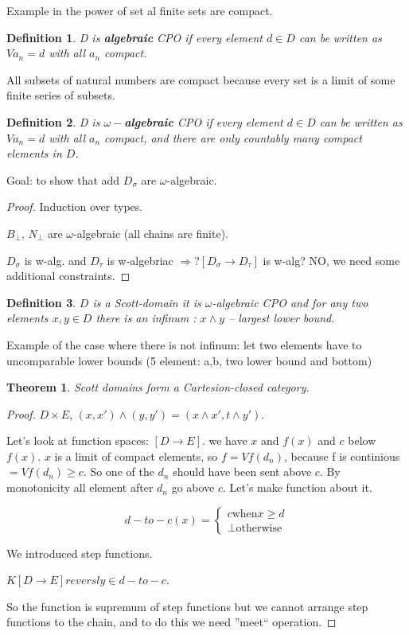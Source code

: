 \documentclass[a4paper,10pt]{book}
\newtheorem{theorem}{Theorem}
\newtheorem{definition}{Definition}
\newcommand{\rarr}{ \rightarrow }
\begin{document}
Example in the power of set al finite sets are compact.

\begin{definition}
 D is \textbf{algebraic} CPO if every element $d\in D$ can be written as $Va_n=d$ with all $a_n$
 compact.
\end{definition}

All subsets of natural numbers are compact because every set is a limit of some finite series of 
subsets.

\begin{definition}
 D is $\omega-$\textbf{algebraic} CPO if every element $d\in D$ can 
 be written as $Va_n=d$ with all $a_n$ compact, and there are only countably many 
 compact elements in $D$.
\end{definition}

Goal: to show that add $D_\sigma$ are $\omega$-algebraic.
\begin{proof}
 Induction over types.
 
 $B_\bot$, $N_\bot$ are $\omega$-algebraic (all chains are finite).
 
 $D_\sigma$ is w-alg. and $D_\tau$ is w-algebriac $\Rightarrow? [D_\sigma \rarr D_\tau]$ is w-alg?
 NO, we need some additional constraints.
\end{proof}

\begin{definition}
 $D$ is a Scott-domain  it is $\omega$-algebraic CPO and for any two elements $x,y\in D$
 there is an  infinum : $x\wedge y$ -- largest lower bound.
\end{definition}

Example of  the case where there is not infinum: let two elements have to uncomparable lower bounds
(5 element: a,b, two lower bound and bottom)

\begin{theorem}
 Scott domains form a Cartesion-closed category.
\end{theorem}
\begin{proof}
 $D\times E$, $(x,x')\wedge(y,y') = (x\wedge x', t\wedge y')$.
 
 Let's look at function spaces: $[D\rarr E]$. we have $x$ and $f(x)$ and $c$ below $f(x)$.
 $x$ is a limit of compact
 elements, so $f=V f(d_n)$, because f is continious $ = Vf(d_n) \geq c$. So one of the $d_n$ should 
 have been sent above $c$. By monotonicity all element after $d_n$ go above $c$. Let's make 
 function about it.
 
\[
    d-to-c(x)=\left\{
                \begin{array}{ll}
                  c \text{when} x\geq d\\
                  \bot \text{otherwise}
                \end{array}
              \right.
  \]

  We introduced step functions.
  
  $K[D\rarr E] reversly \in d-to-c$.
  
  So the function is supremum of step functions but we cannot arrange step functions to the chain,
  and to do this we need ''meet`` operation.
\end{proof}
\end{document}
